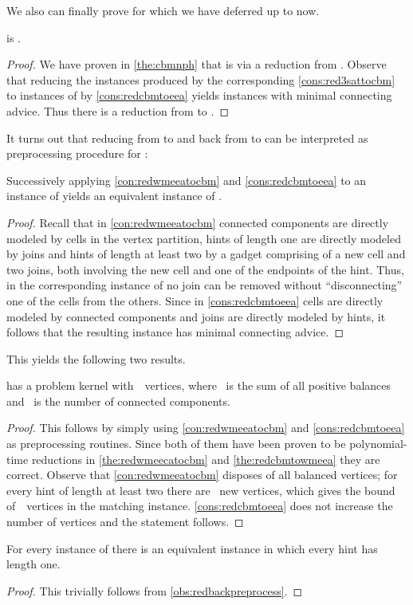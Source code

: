 We also can finally prove \NPhs{} for \pWMEECAs{} which we have deferred up to now.
\begin{corollary}\label{cor:eecanph}
  \pWMEECAs{} is \NPh .
\end{corollary}
\begin{proof}
  We have proven in \autoref{the:cbmnph} that \pCBMs{} is \NPh{} via a reduction from \ptSATs{}. Observe that reducing the instances produced by the corresponding \autoref{cons:red3sattocbm} to instances of \pWMEEAs{} by \autoref{cons:redcbmtoeea} yields instances with minimal connecting advice. Thus there is a reduction from \ptSATs{} to \pWMEECAs{}.
\end{proof}
It turns out that reducing from \pWMEECAs{} to \pCBMs{} and back from \pCBMs{} to \pWMEEAs{} can be interpreted as preprocessing procedure for \pWMEECAs{}:
\begin{observation}\label{obs:redbackpreprocess}
  Successively applying \autoref{con:redwmeeatocbm} and \autoref{cons:redcbmtoeea} to an instance of \pWMEECAs{} yields an equivalent instance of \pWMEECAs{}.
\end{observation}
\begin{proof}
  Recall that in \autoref{con:redwmeeatocbm} connected components are directly modeled by cells in the vertex partition, hints of length one are directly modeled by joins and hints of length at least two by a gadget comprising of a new cell and two joins, both involving the new cell and one of the endpoints of the hint. Thus, in the corresponding instance of \pCBMs{} no join can be removed without ``disconnecting'' one of the cells from the others. Since in \autoref{cons:redcbmtoeea} cells are directly modeled by connected components and joins are directly modeled by hints, it follows that the resulting instance has minimal connecting advice.
\end{proof}
This yields the following two results.
\begin{corollary}\label{cor:eecaprobkernel}
  \pWMEECAs{} has a problem kernel with~~vertices, where~ is the sum of all positive balances and~ is the number of connected components.
\end{corollary}
\begin{proof}
  This follows by simply using \autoref{con:redwmeeatocbm} and \autoref{cons:redcbmtoeea} as preprocessing routines. Since both of them have been proven to be polynomial-time reductions in \autoref{the:redwmeecatocbm} and \autoref{the:redcbmtowmeea} they are correct. Observe that \autoref{con:redwmeeatocbm} disposes of all balanced vertices; for every hint of length at least two there are~ new vertices, which gives the bound of~~vertices in the matching instance. \autoref{cons:redcbmtoeea} does not increase the number of vertices and the statement follows.
\end{proof}
\begin{corollary}
  For every instance of \pWMEECAs{} there is an equivalent instance in which every hint has length one.
\end{corollary}
\begin{proof}
  This trivially follows from \autoref{obs:redbackpreprocess}.
\end{proof}

